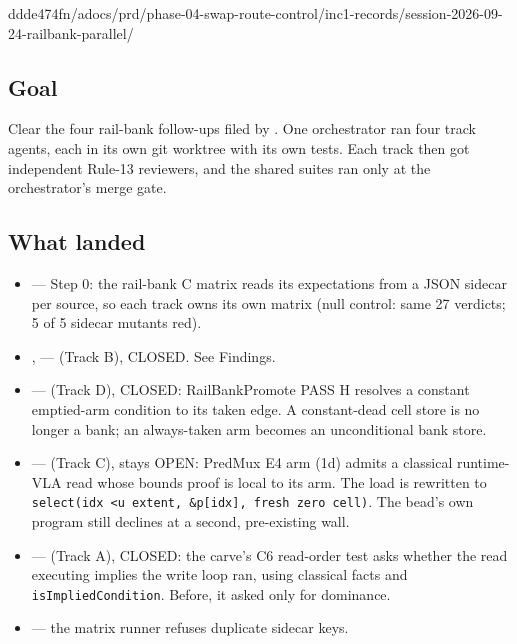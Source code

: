 %
  {ddde474f}{n/a}{docs/prd/phase-04-swap-route-control/inc1-records/session-2026-09-24-railbank-parallel/}

\subsection*{Goal}
Clear the four rail-bank follow-ups filed by .
One orchestrator ran four track agents, each in its own git worktree with its
own tests. Each track then got independent Rule-13 reviewers, and the shared
suites ran only at the orchestrator's merge gate.

\subsection*{What landed}
\begin{itemize}
  \item {} --- Step 0: the rail-bank C matrix reads its
    expectations from a JSON sidecar per source, so each track owns its own
    matrix (null control: same 27 verdicts; 5 of 5 sidecar mutants red).
  \item {},  --- 
    (Track B), CLOSED. See Findings.
  \item {} ---  (Track D), CLOSED:
    RailBankPromote PASS H resolves a constant emptied-arm condition to its
    taken edge. A constant-dead cell store is no longer a bank; an always-taken
    arm becomes an unconditional bank store.
  \item {} ---  (Track C), stays
    OPEN: PredMux E4 arm (1d) admits a classical runtime-VLA read whose bounds
    proof is local to its arm. The load is rewritten to
    \texttt{select(idx <u extent, \&p[idx], fresh zero cell)}. The bead's own
    program still declines at a second, pre-existing wall.
  \item {} ---  (Track A), CLOSED:
    the carve's C6 read-order test asks whether the read executing implies the
    write loop ran, using classical facts and \texttt{isImpliedCondition}.
    Before, it asked only for dominance.
  \item {} --- the matrix runner refuses duplicate sidecar keys.
\end{itemize}

